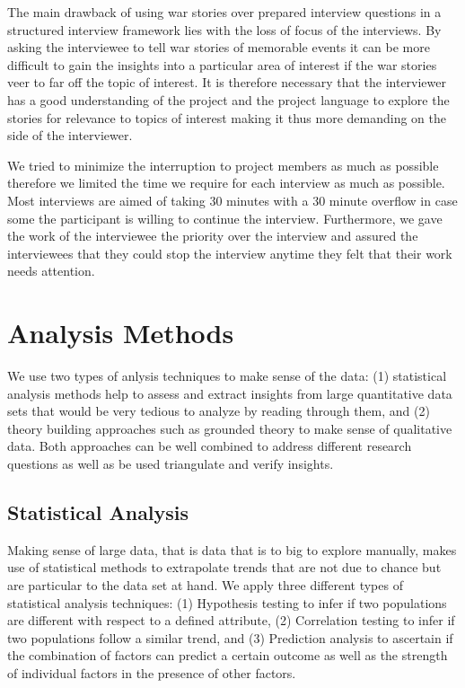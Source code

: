 The main drawback of using war stories over prepared interview questions in a structured interview framework lies with the loss of focus of the interviews.
By asking the interviewee to tell war stories of memorable events it can be more difficult to gain the insights into a particular area of interest if the war stories veer to far off the topic of interest.
It is therefore necessary that the interviewer has a good understanding of the project and the project language to explore the stories for relevance to topics of interest making it thus more demanding on the side of the interviewer.

We tried to minimize the interruption to project members as much as possible therefore we limited the time we require for each interview as much as possible.
Most interviews are aimed of taking 30 minutes with a 30 minute overflow in case some the participant is willing to continue the interview.
Furthermore, we gave the work of the interviewee the priority over the interview and assured the interviewees that they could stop the interview anytime they felt that their work needs attention.

\section{Analysis Methods}
\label{c5:sec:analysis}
We use two types of anlysis techniques to make sense of the data: (1) statistical analysis methods help to assess and extract insights from large quantitative data sets that would be very tedious to analyze by reading through them, and (2) theory building approaches such as grounded theory to make sense of qualitative data.
Both approaches can be well combined to address different research questions as well as be used triangulate and verify insights.

\subsection{Statistical Analysis}
Making sense of large data, that is data that is to big to explore manually, makes use of statistical methods to extrapolate trends that are not due to chance but are particular to the data set at hand.
We apply three different types of statistical analysis techniques: (1) Hypothesis testing to infer if two populations are different with respect to a defined attribute, (2) Correlation testing to infer if two populations follow a similar trend, and (3) Prediction analysis to ascertain if the combination of factors can predict a certain outcome as well as the strength of individual factors in the presence of other factors. 

